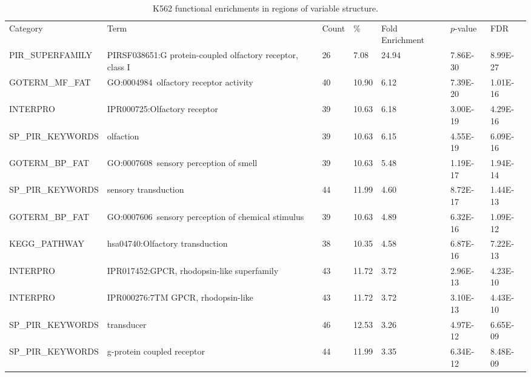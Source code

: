 \documentclass[a4paper,10pt,oneside]{book}
\begin{document}
\clearpage

{\scriptsize 
\begin{longtable}{lllllll}
\caption{
K562 functional enrichments in regions of variable structure.
}\label{tab:k5go}\\
\endfirsthead

Category          & Term
& Count & \%    & Fold Enrichment & $p$-value   & FDR      \\
PIR\_SUPERFAMILY  & PIRSF038651:G protein-coupled olfactory receptor, class I       & 26    & 7.08  & 24.94           & 7.86E-30 & 8.99E-27 \\
GOTERM\_MF\_FAT   & GO:0004984~olfactory receptor activity                          & 40    & 10.90 & 6.12            & 7.39E-20 & 1.01E-16 \\
INTERPRO          & IPR000725:Olfactory receptor                                    & 39    & 10.63 & 6.18            & 3.00E-19 & 4.29E-16 \\
SP\_PIR\_KEYWORDS & olfaction                                                       & 39    & 10.63 & 6.15            & 4.55E-19 & 6.09E-16 \\
GOTERM\_BP\_FAT   & GO:0007608~sensory perception of smell                          & 39    & 10.63 & 5.48            & 1.19E-17 & 1.94E-14 \\
SP\_PIR\_KEYWORDS & sensory transduction                                            & 44    & 11.99 & 4.60            & 8.72E-17 & 1.44E-13 \\
GOTERM\_BP\_FAT   & GO:0007606~sensory perception of chemical stimulus              & 39    & 10.63 & 4.89            & 6.32E-16 & 1.09E-12 \\
KEGG\_PATHWAY     & hsa04740:Olfactory transduction                                 & 38    & 10.35 & 4.58            & 6.87E-16 & 7.22E-13 \\
INTERPRO          & IPR017452:GPCR, rhodopsin-like superfamily                      & 43    & 11.72 & 3.72            & 2.96E-13 & 4.23E-10 \\
INTERPRO          & IPR000276:7TM GPCR, rhodopsin-like                              & 43    & 11.72 & 3.72            & 3.10E-13 & 4.43E-10 \\
SP\_PIR\_KEYWORDS & transducer                                                      & 46    & 12.53 & 3.26            & 4.97E-12 & 6.65E-09 \\
SP\_PIR\_KEYWORDS & g-protein coupled receptor                                      & 44    & 11.99 & 3.35            & 6.34E-12 & 8.48E-09 \\

\end{longtable}}
\end{document}
